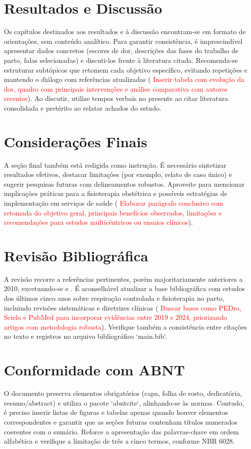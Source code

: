 \section*{Resultados e Discussão}
Os capítulos destinados aos resultados e à discussão encontram-se em formato de orientações, sem conteúdo analítico. Para garantir consistência, é imprescindível apresentar dados concretos (escores de dor, descrições das fases do trabalho de parto, falas selecionadas) e discuti-los frente à literatura citada. Recomenda-se estruturar subtópicos que retomem cada objetivo específico, evitando repetições e mantendo o diálogo com referências atualizadas (
\textcolor{red}{Inserir tabela com evolução da dor, quadro com principais intervenções e análise comparativa com autores recentes}). Ao discutir, utilize tempos verbais no presente ao citar literatura consolidada e pretérito ao relatar achados do estudo.

\section*{Considerações Finais}
A seção final também está redigida como instrução. É necessário sintetizar resultados efetivos, destacar limitações (por exemplo, relato de caso único) e sugerir pesquisas futuras com delineamentos robustos. Aproveite para mencionar implicações práticas para a fisioterapia obstétrica e possíveis estratégias de implementação em serviços de saúde (
\textcolor{red}{Elaborar parágrafo conclusivo com retomada do objetivo geral, principais benefícios observados, limitações e recomendações para estudos multicêntricos ou ensaios clínicos}).

\section*{Revisão Bibliográfica}
A revisão recorre a referências pertinentes, porém majoritariamente anteriores a 2010, excetuando-se  e \cite{sousa2021}. É aconselhável atualizar a base bibliográfica com estudos dos últimos cinco anos sobre respiração controlada e fisioterapia no parto, incluindo revisões sistemáticas e diretrizes clínicas (
\textcolor{red}{Buscar bases como PEDro, Scielo e PubMed para incorporar evidências entre 2019 e 2024, priorizando artigos com metodologia robusta}). Verifique também a consistência entre citações no texto e registros no arquivo bibliográfico `main.bib`.

\section*{Conformidade com ABNT}
O documento preserva elementos obrigatórios (capa, folha de rosto, dedicatória, resumo/abstract) e utiliza o pacote `abntcite`, alinhando-se às normas. Contudo, é preciso inserir listas de figuras e tabelas apenas quando houver elementos correspondentes e garantir que as seções futuras contenham títulos numerados coerentes com o sumário. Reforce a apresentação das palavras-chave em ordem alfabética e verifique a limitação de três a cinco termos, conforme NBR 6028.
